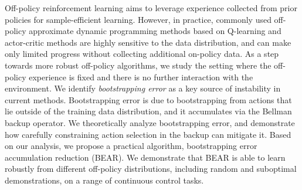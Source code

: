 Off-policy reinforcement learning aims to leverage experience collected from prior policies for sample-efficient learning. However, in practice, commonly used off-policy approximate dynamic programming methods based on Q-learning and actor-critic methods are highly sensitive to the data distribution, and can make only limited progress without collecting additional on-policy data. As a step towards more robust off-policy algorithms, we study the setting where the off-policy experience is fixed and there is no further interaction with the environment. We identify \emph{bootstrapping error} as a key source of instability in current methods. Bootstrapping error is due to bootstrapping from actions that lie outside of the training data distribution, and it accumulates via the Bellman backup operator. We theoretically analyze bootstrapping error, and demonstrate how carefully constraining action selection in the backup can mitigate it. Based on our analysis, we propose a practical algorithm, bootstrapping error accumulation reduction (BEAR). We demonstrate that BEAR is able to learn robustly from different off-policy distributions, including random and suboptimal demonstrations, on a range of continuous control tasks.

